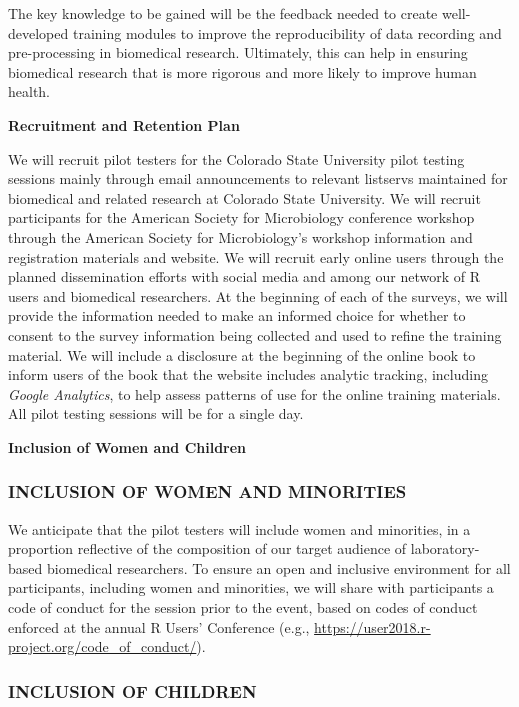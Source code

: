 \documentclass[pdftex,english,11.5pt,parskip=half]{scrartcl}
\begin{document}
The 
key knowledge to be gained will be the feedback needed to create well-developed training modules to improve the 
reproducibility of data recording and pre-processing in biomedical research. 
Ultimately, this can help in ensuring biomedical research that is more 
rigorous and more likely to improve human health.

\pagebreak

{\large \textbf{Recruitment and Retention Plan}}

We will recruit pilot testers for the Colorado State University pilot testing sessions mainly through email announcements to relevant listservs maintained for biomedical and related research at Colorado State University. We will recruit participants for the American Society for Microbiology conference workshop through the American Society for Microbiology's workshop information and registration materials and website. We will recruit early online users through the planned dissemination efforts with social media and among our network of R users and biomedical researchers. At the beginning of each of the surveys, we will provide the information needed to make an
informed choice for whether to consent to the survey information being collected and
used to refine the training material. We will include a disclosure at the beginning of 
the online book to inform users of the book that the website includes analytic 
tracking, including \textit{Google Analytics}, to help assess patterns of use for the 
online training materials. All pilot testing sessions will be for a single day.

\pagebreak

{\large \textbf{Inclusion of Women and Children}}

\subsubsection*{INCLUSION OF WOMEN AND MINORITIES}

We anticipate that the pilot testers will include women and minorities, in a 
proportion reflective of the composition of our target audience of laboratory-based
biomedical researchers. To ensure an open and inclusive environment for all 
participants, including women and minorities, we will share with participants a 
code of conduct for the session prior to the event, based on codes of conduct 
enforced at the annual R Users' Conference (e.g., \url{https://user2018.r-project.org/code_of_conduct/}).

\subsubsection*{INCLUSION OF CHILDREN}
\end{document}
